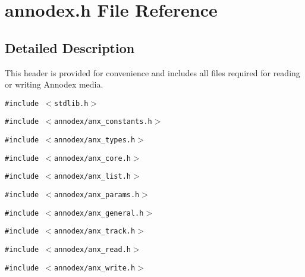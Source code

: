 \section{annodex.h File Reference}
\label{annodex_8h}


\subsection{Detailed Description}
This header is provided for convenience and includes all files required for reading or writing Annodex media. 



{\tt \#include $<$stdlib.h$>$}\par
{\tt \#include $<$annodex/anx\_\-constants.h$>$}\par
{\tt \#include $<$annodex/anx\_\-types.h$>$}\par
{\tt \#include $<$annodex/anx\_\-core.h$>$}\par
{\tt \#include $<$annodex/anx\_\-list.h$>$}\par
{\tt \#include $<$annodex/anx\_\-params.h$>$}\par
{\tt \#include $<$annodex/anx\_\-general.h$>$}\par
{\tt \#include $<$annodex/anx\_\-track.h$>$}\par
{\tt \#include $<$annodex/anx\_\-read.h$>$}\par
{\tt \#include $<$annodex/anx\_\-write.h$>$}\par
